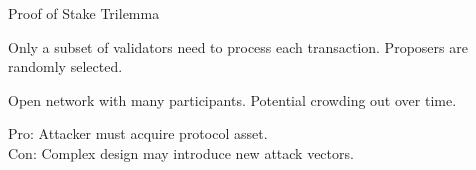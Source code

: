 \documentclass[]{beamer}
\begin{document}
	\begin{frame}{Proof of Stake Trilemma}
		\begin{center}
			\begin{tikzpicture}[scale=0.6, every node/.style ={scale=0.8}]
				
			\end{tikzpicture}
		\end{center}
		
		\begin{description}[labelwidth=10em]
			\item[\textbf{Scalability}] Only a subset of validators need to process each transaction. Proposers are randomly selected.
			\item[\textbf{Decentralization}] Open network with many participants. Potential crowding out over time.
			\item[\textbf{Security}] Pro: Attacker must acquire protocol asset.\\ Con: Complex design may introduce new attack vectors.
		\end{description}
	\end{frame}
	
\end{document}
